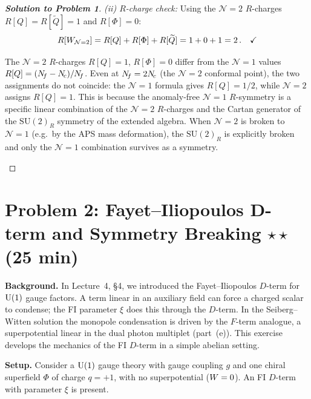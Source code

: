 \documentclass[11pt,a4paper]{article}
\begin{document}
\begin{proof}[\textbf{Solution to Problem 1}]
\textit{(ii) $R$-charge check:}  Using the $\mathcal{N}=2$ $R$-charges
$R[Q] = R[\widetilde{Q}] = 1$ and $R[\Phi] = 0$:
\[
  R[W_{\mathcal{N}=2}] = R[Q] + R[\Phi] + R[\widetilde{Q}]
  = 1 + 0 + 1 = 2\,.
  \quad\checkmark
\]

\begin{remark}[$\mathcal{N}=2$ vs.\ $\mathcal{N}=1$ $R$-charges]
The $\mathcal{N}=2$ $R$-charges $R[Q] = 1$, $R[\Phi] = 0$ differ from
the $\mathcal{N}=1$ values $R[Q] = (N_{\!f} - N_{\!c})/N_{\!f}$.  Even at
$N_{\!f} = 2N_{\!c}$ (the $\mathcal{N}=2$ conformal point), the two
assignments do not coincide: the $\mathcal{N}=1$ formula gives
$R[Q] = 1/2$, while $\mathcal{N}=2$ assigns $R[Q] = 1$.  This is
because the anomaly-free $\mathcal{N}=1$ $R$-symmetry is a specific
linear combination of the $\mathcal{N}=2$ $R$-charges and the Cartan
generator of the $\mathrm{SU}(2)_R$ symmetry of the extended algebra.
When $\mathcal{N}=2$ is broken to $\mathcal{N}=1$ (e.g.\ by the APS
mass deformation), the $\mathrm{SU}(2)_R$ is explicitly broken and
only the $\mathcal{N}=1$ combination survives as a symmetry.
\end{remark}

\end{proof}

\newpage


\section*{Problem 2: Fayet--Iliopoulos D-term and Symmetry Breaking
  \hfill $\star\star$ \normalsize(25 min)}
\label{prob:FI-Dterm}

\noindent\textbf{Background.}
In Lecture~4, \S4, we introduced the Fayet--Iliopoulos $D$-term for
$\mathrm{U}(1)$ gauge factors.  A term linear in an auxiliary field can force
a charged scalar to condense; the FI parameter $\xi$ does this through
the $D$-term.  In the Seiberg--Witten solution the monopole condensation
is driven by the $F$-term analogue, a superpotential linear in the dual
photon multiplet (part~(e)).  This exercise develops the mechanics of the
FI $D$-term in a simple abelian setting.

\medskip

\noindent\textbf{Setup.}
Consider a $\mathrm{U}(1)$ gauge theory with gauge coupling $g$ and one
chiral superfield $\Phi$ of charge $q = +1$, with no superpotential
($W = 0$).  An FI $D$-term with parameter $\xi$ is present.
\end{document}
